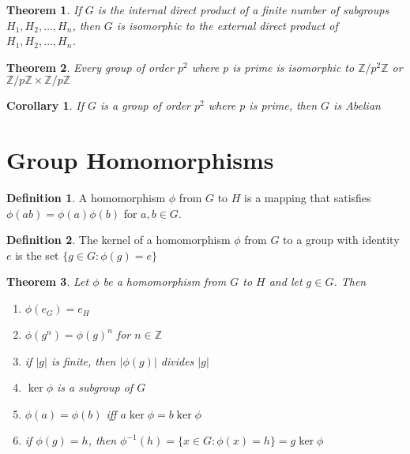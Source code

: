 \documentclass{article}
\newcommand{\Z}{\mathbb{Z}}
\newtheorem{theorem}{Theorem}[section]
\newtheorem*{corollary}{Corollary}
\theoremstyle{definition}
\newtheorem*{definition}{Definition}
\begin{document}
\begin{theorem}
    If $G$ is the internal direct product of a finite number of subgroups $H_1, H_2, \dots, H_n$, then $G$ is isomorphic to the external direct product of $H_1, H_2, \dots, H_n$.
\end{theorem}

\begin{theorem}
    Every group of order $p^2$ where $p$ is prime is isomorphic to $\Z/p^2\Z$ or $\Z/p\Z \times \Z/p\Z$
\end{theorem}

\begin{corollary}
    If $G$ is a group of order $p^2$ where $p$ is prime, then $G$ is Abelian
\end{corollary}

\section{Group Homomorphisms}

\begin{definition}
    A homomorphism $\phi$ from $G$ to $H$ is a mapping that satisfies $\phi(ab) = \phi(a)\phi(b)$ for $a, b \in G$.
\end{definition}

\begin{definition}
    The kernel of a homomorphism $\phi$ from $G$ to a group with identity $e$ is the set $\{g \in G : \phi(g) = e\}$
\end{definition}

\begin{theorem}
    Let $\phi$ be a homomorphism from $G$ to $H$ and let $g \in G$. Then
    \begin{enumerate}
        \item $\phi(e_G) = e_H$
        \item $\phi(g^n) = \phi(g)^n$ for $n \in \Z$
        \item if $|g|$ is finite, then $|\phi(g)|$ divides $|g|$
        \item $\ker \phi$ is a subgroup of $G$
        \item $\phi(a) = \phi(b)$ iff $a \ker \phi = b \ker \phi$
        \item if $\phi(g) = h$, then $\phi^{-1}(h) = \{x \in G : \phi(x) = h\} = g \ker \phi$
    \end{enumerate}
\end{theorem}
\end{document}
